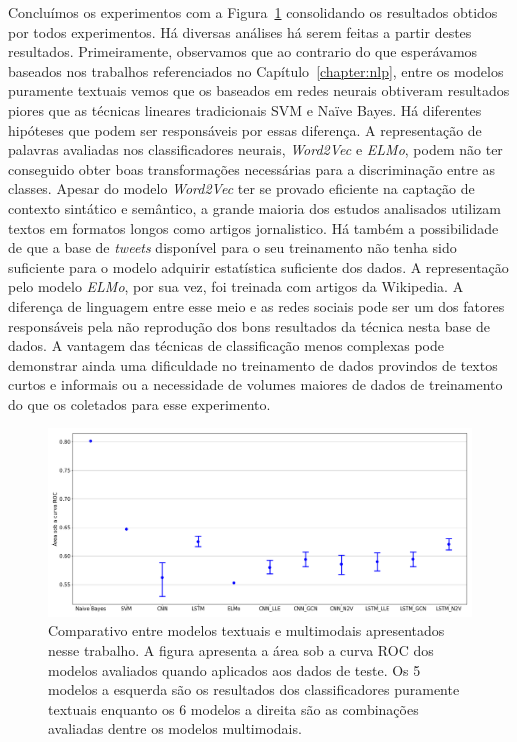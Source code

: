 Concluímos os experimentos com a Figura~\ref{fig:experiment_results}
consolidando os resultados obtidos por todos experimentos.
Há diversas análises há serem feitas a partir destes resultados.
Primeiramente, observamos que ao contrario do que esperávamos baseados nos
trabalhos referenciados no Capítulo~\ref{chapter:nlp}, entre os modelos
puramente textuais vemos que os baseados em redes neurais obtiveram resultados
piores que as técnicas lineares tradicionais SVM e Naïve Bayes.
Há diferentes hipóteses que podem ser responsáveis por essas diferença.
A representação de palavras avaliadas nos classificadores neurais,
\textit{Word2Vec} e \textit{ELMo}, podem não ter conseguido obter boas
transformações necessárias para a discriminação entre as classes.
Apesar do modelo \textit{Word2Vec} ter se provado eficiente na captação de
contexto sintático e semântico, a grande maioria dos estudos analisados utilizam
textos em formatos longos como artigos jornalistico.
Há também a possibilidade de que a base de \textit{tweets} disponível para o seu
treinamento não tenha sido suficiente para o modelo adquirir estatística
suficiente dos dados.
A representação pelo modelo \textit{ELMo}, por sua vez, foi treinada com artigos
da Wikipedia.
A diferença de linguagem entre esse meio e as redes sociais pode ser um dos
fatores responsáveis pela não reprodução dos bons resultados da técnica nesta
base de dados.
A vantagem das técnicas de classificação menos complexas pode demonstrar ainda
uma dificuldade no treinamento de dados provindos de textos curtos e informais
ou a necessidade de volumes maiores de dados de treinamento do que os coletados
para esse experimento.

\begin{figure}[h]
\begin{center} {
    \begin{center}
    \includegraphics[scale=0.35]{images/experiment_results.png}
    \caption{Comparativo entre modelos textuais e multimodais apresentados nesse
             trabalho. A figura apresenta a área sob a curva ROC dos modelos
             avaliados quando aplicados aos dados de teste. Os 5 modelos a esquerda
             são os resultados dos classificadores puramente textuais enquanto os 6
             modelos a direita são as combinações avaliadas dentre os modelos multimodais.}
    \label{fig:experiment_results}
    \end{center}
}
\end{center}
\end{figure}


